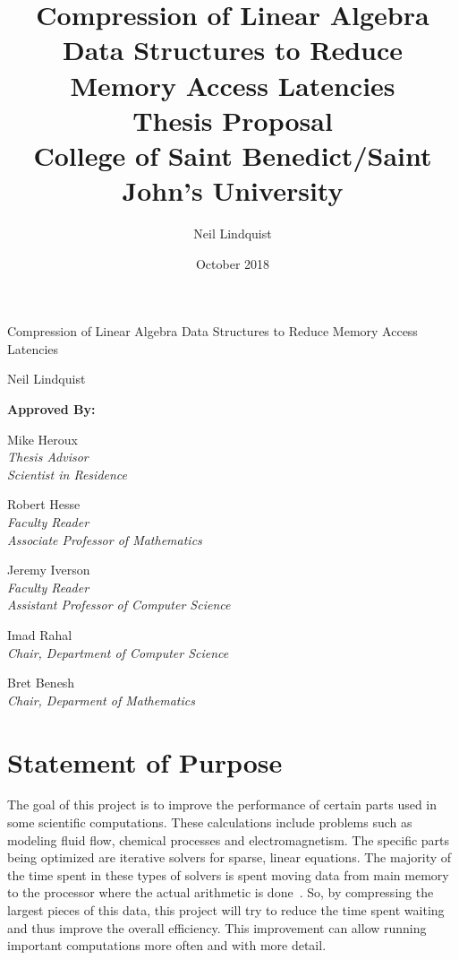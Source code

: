 \documentclass[titlepage]{article}
\begin{document}
\title{
	Compression of Linear Algebra Data Structures to Reduce Memory Access Latencies \\
	\bigskip
	\Large Thesis Proposal\\
	\bigskip
	College of Saint Benedict/Saint John's University}
\author{Neil Lindquist}
\date{October 2018}

\maketitle

\begin{center}
	{\Large Compression of Linear Algebra Data Structures to Reduce Memory Access Latencies}
	
	Neil Lindquist
	
	\bigskip
	\bigskip
	
	\textbf{Approved By:}
	
	\bigskip
	
	Mike Heroux\\
	\textit{Thesis Advisor}\\
	\textit{Scientist in Residence}

	\bigskip

	Robert Hesse\\
	\textit{Faculty Reader}\\
	\textit{Associate Professor of Mathematics}

	\bigskip

	Jeremy Iverson\\
	\textit{Faculty Reader}\\
	\textit{Assistant Professor of Computer Science}
	
	\bigskip
	
	Imad Rahal\\
	\textit{Chair, Department of Computer Science}
	
	\bigskip
	
	Bret Benesh\\
	\textit{Chair, Deparment of Mathematics}
\end{center}

\clearpage


\section{Statement of Purpose}
The goal of this project is to improve the performance of certain parts
used in some scientific computations.
These calculations include problems such as modeling fluid flow, chemical processes and electromagnetism.
The specific parts being optimized are iterative solvers for sparse, linear equations.
The majority of the time spent in these types of solvers is spent moving data from main memory
to the processor where the actual arithmetic is done~\cite{Lawlor:2013:compression}.
So, by compressing the largest pieces of this data, this project will try to reduce the time spent waiting and thus improve the overall efficiency.
This improvement can allow running important computations more often and with more detail.
\end{document}
